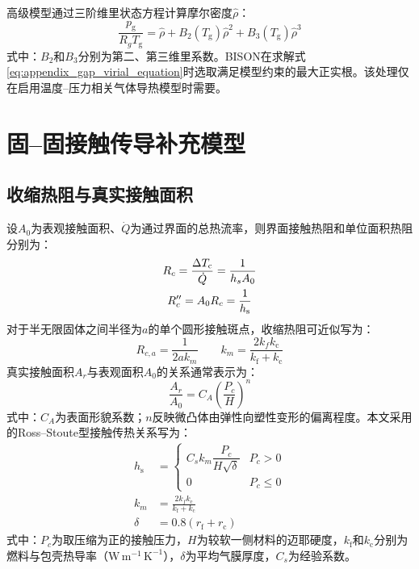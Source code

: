高级模型通过三阶维里状态方程计算摩尔密度$\hat\rho$：
\begin{equation}
	\frac{p_{\mathrm g}}{R_gT_{\mathrm g}}
	=\hat\rho+B_2(T_{\mathrm g})\hat\rho^2+B_3(T_{\mathrm g})\hat\rho^3
	\label{eq:appendix_gap_virial_equation}
\end{equation}
\noindent 式中：$B_2$和$B_3$分别为第二、第三维里系数。BISON在求解式\eqref{eq:appendix_gap_virial_equation}时选取满足模型约束的最大正实根。该处理仅在启用温度--压力相关气体导热模型时需要。

\section{固--固接触传导补充模型}
\label{app:gap_contact_supplementary_models}

\subsection{收缩热阻与真实接触面积}

设$A_0$为表观接触面积、$\dot Q$为通过界面的总热流率，则界面接触热阻和单位面积热阻分别为：
\begin{gather}
	R_c=\frac{\Delta T_{\mathrm c}}{\dot Q}
	=\frac{1}{h_sA_0}
	\notag
	\\
	R_c''=A_0R_c=\frac{1}{h_{\mathrm s}}
	\label{eq:appendix_gap_contact_resistance}
\end{gather}
对于半无限固体之间半径为$a$的单个圆形接触斑点，收缩热阻可近似写为：
\begin{equation}
	R_{c,a}=\frac{1}{2ak_m}
	\qquad
	k_m=\frac{2k_fk_{\mathrm c}}{k_{\mathrm f}+k_{\mathrm c}}
	\label{eq:appendix_gap_single_spot_resistance}
\end{equation}
真实接触面积$A_r$与表观面积$A_0$的关系通常表示为：
\begin{equation}
	\frac{A_r}{A_0}
	=C_A\left(\frac{P_c}{H}\right)^n
	\label{eq:appendix_gap_real_contact_area}
\end{equation}
\noindent 式中：$C_A$为表面形貌系数；$n$反映微凸体由弹性向塑性变形的偏离程度。本文采用的Ross--Stoute型接触传热关系写为：
\begin{subequations}\label{eq:appendix_gap_solid_contact_model}
	\begin{align}
		h_{\mathrm s}
		&=
		\begin{cases}
			C_s k_m\dfrac{P_c}{H\sqrt{\delta}} & P_c>0\\[1.0ex]
			0 & P_c\leq0
		\end{cases}
		\label{eq:appendix_gap_solid_contact_conductance}\\
		k_m&=\frac{2k_fk_{\mathrm c}}{k_{\mathrm f}+k_{\mathrm c}}
		\label{eq:appendix_gap_effective_solid_conductivity}\\
		\delta&=0.8\left(r_{\mathrm f}+r_{\mathrm c}\right)
		\label{eq:appendix_gap_average_film_thickness}
	\end{align}
\end{subequations}
\noindent 式中：$P_c$为取压缩为正的接触压力，$H$为较软一侧材料的迈耶硬度，$k_{\mathrm f}$和$k_{\mathrm c}$分别为燃料与包壳热导率（$\mathrm{W\,m^{-1}\,K^{-1}}$），$\delta$为平均气膜厚度，$C_s$为经验系数。

